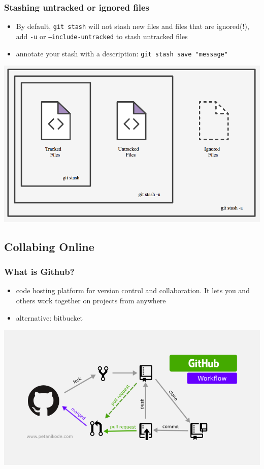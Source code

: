 \documentclass[12pt]{beamer}
\begin{document}
\begin{frame}
\frametitle{Stashing untracked or ignored files}
\begin{itemize}
\item By default, \texttt{git stash} will not stash new files and files that are ignored(!), add \texttt{-u} or \texttt{--include-untracked} to stash untracked files
\item annotate your stash with a description: \texttt{git stash save "message"}
\end{itemize}
\begin{center}
\includegraphics[width=0.5\linewidth]{stash_options}
\end{center}
\end{frame}



\subsection{Collabing Online}
\begin{frame}
\frametitle{What is Github?}
\begin{itemize}
	\item code hosting platform for version control and collaboration. It lets you and others work together on projects from anywhere
	\item alternative: bitbucket
\end{itemize}
\begin{center}
	\includegraphics[width=0.75\linewidth]{github-workflow}
\end{center}
\end{frame}
\end{document}

